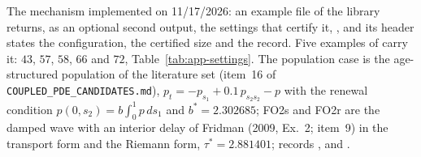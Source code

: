 The mechanism implemented on 11/17/2026: an example file of the library returns, as an optional second output, the settings that certify it, , and its header states the configuration, the certified size and the record. Five examples of  carry it: $43$, $57$, $58$, $66$ and $72$, Table~\ref{tab:app-settings}. The population case is the age-structured population of the literature set (item~16 of \texttt{COUPLED\_PDE\_CANDIDATES.md}), $p_t=-p_{s_1}+0.1\,p_{s_2s_2}-p$ with the renewal condition $p(0,s_2)=b\int_0^1p\,ds_1$ and $b^*=2.302685$; FO2s and FO2r are the damped wave with an interior delay of Fridman (2009, Ex.~2; item~9) in the transport form and the Riemann form, $\tau^*=2.881401$; records ,  and .
